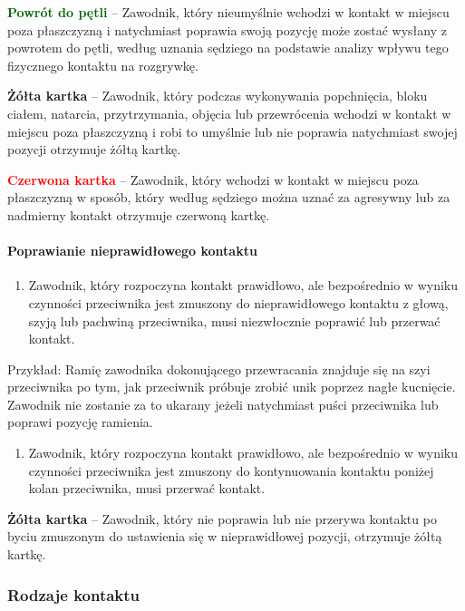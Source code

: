 \documentclass[12pt]{article}
\newcommand\redcard[1]{\bgroup\textcolor{red}{\textbf{#1}}}
\newcommand\yellowcard[1]{\bgroup\textcolor{darkyellow}{\textbf{#1}}}
\newcommand\other[1]{\bgroup\textcolor{darkgreen}{\textbf{#1}}}
\begin{document}
\other{Powrót do pętli} -- Zawodnik, który nieumyślnie wchodzi w kontakt w
miejscu poza płaszczyzną i natychmiast poprawia swoją pozycję może
zostać wysłany z powrotem do pętli, według uznania sędziego na podstawie
analizy wpływu tego fizycznego kontaktu na rozgrywkę.

\yellowcard{Żółta kartka} -- Zawodnik, który podczas wykonywania popchnięcia,
bloku ciałem, natarcia, przytrzymania, objęcia lub przewrócenia wchodzi
w kontakt w miejscu poza płaszczyzną i robi to umyślnie lub nie poprawia
natychmiast swojej pozycji otrzymuje żółtą kartkę.

\redcard{Czerwona kartka} -- Zawodnik, który wchodzi w kontakt w miejscu
poza płaszczyzną w sposób, który według sędziego można uznać za
agresywny lub za nadmierny kontakt otrzymuje czerwoną kartkę.

\paragraph{Poprawianie nieprawidłowego kontaktu}

\begin{enumerate}
	\item
	      Zawodnik, który rozpoczyna kontakt prawidłowo, ale bezpośrednio w
	      wyniku czynności przeciwnika jest zmuszony do nieprawidłowego kontaktu
	      z głową, szyją lub pachwiną przeciwnika, musi niezwłocznie poprawić
	      lub przerwać kontakt.
\end{enumerate}

Przykład: Ramię zawodnika dokonującego przewracania
znajduje się na szyi przeciwnika po tym, jak przeciwnik próbuje zrobić
unik poprzez nagłe kucnięcie. Zawodnik nie zostanie za to ukarany jeżeli
natychmiast puści przeciwnika lub poprawi pozycję ramienia.

\begin{enumerate}[resume]
	\item
	      Zawodnik, który rozpoczyna kontakt prawidłowo, ale bezpośrednio w
	      wyniku czynności przeciwnika jest zmuszony do kontynuowania kontaktu
	      poniżej kolan przeciwnika, musi przerwać kontakt.
\end{enumerate}

\yellowcard{Żółta kartka} -- Zawodnik, który nie poprawia lub nie przerywa
kontaktu po byciu zmuszonym do ustawienia się w nieprawidłowej pozycji,
otrzymuje żółtą kartkę.

\subsubsection{Rodzaje kontaktu}
\end{document}
